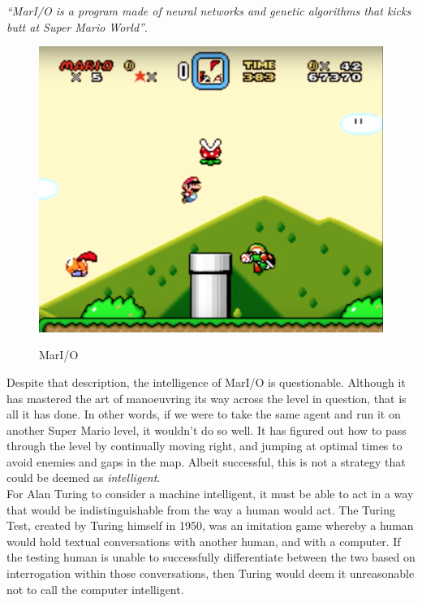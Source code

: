 \documentclass[12pt,a4paper]{article}
\begin{document}
\textit{\enquote{MarI/O is a program made of neural networks and genetic algorithms that kicks butt at Super Mario World}}\citep{MarIO}.\\

\begin{figure}[h]
	\centering
	\includegraphics[width = \textwidth]{MarIO.png}
	\caption{MarI/O}
	\citep{MarIO} 
\end{figure}

Despite that description, the intelligence of MarI/O is questionable. Although it has mastered the art of manoeuvring its way across the level in question, that is all it has done. In other words, if we were to take the same agent and run it on another Super Mario level, it wouldn't do so well. It has figured out how to pass through the level by continually moving right, and jumping at optimal times to avoid enemies and gaps in the map. Albeit successful, this is not a strategy that could be deemed as \textit{intelligent}.\\

For Alan Turing to consider a machine intelligent, it must be able to act in a way that would be indistinguishable from the way a human would act. The Turing Test, created by Turing himself in 1950, was an imitation game whereby a human would hold textual conversations with another human, and with a computer. If the testing human is unable to successfully differentiate between the two based on interrogation within those conversations, then Turing would deem it unreasonable not to call the computer intelligent\citep{TuringTest}.\\
\end{document}
